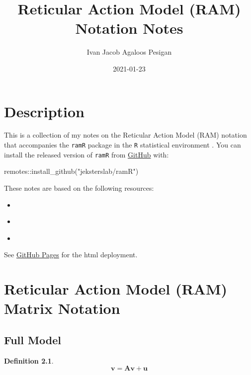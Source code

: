 \documentclass[
]{book}
\title{Reticular Action Model (RAM) Notation Notes}
\author{Ivan Jacob Agaloos Pesigan}
\date{2021-01-23}
\newenvironment{Shaded}{\begin{snugshade}}{\end{snugshade}}
\newcommand{\FunctionTok}[1]{\textcolor[rgb]{0.00,0.00,0.00}{#1}}
\newcommand{\NormalTok}[1]{#1}
\newcommand{\SpecialCharTok}[1]{\textcolor[rgb]{0.00,0.00,0.00}{#1}}
\newcommand{\StringTok}[1]{\textcolor[rgb]{0.31,0.60,0.02}{#1}}
\providecommand{\tightlist}{%
  \setlength{\itemsep}{0pt}\setlength{\parskip}{0pt}}
\theoremstyle{definition}
\newtheorem{definition}{Definition}[chapter]
\theoremstyle{definition}
\theoremstyle{definition}
\theoremstyle{remark}
\begin{document}
\maketitle

{
\setcounter{tocdepth}{1}
\tableofcontents
}
\hypertarget{description}{%
\chapter{Description}\label{description}}

This is a collection of my notes
on the Reticular Action Model (RAM) notation
that accompanies the \texttt{ramR} package \citep{R-ramR}
in the \texttt{R} statistical environment \citep{R-base}.
You can install the released version of \texttt{ramR}
from \href{https://github.com/jeksterslab/ramR}{GitHub} with:

\begin{Shaded}
\begin{Highlighting}[]
\NormalTok{remotes}\SpecialCharTok{::}\FunctionTok{install\_github}\NormalTok{(}\StringTok{"jeksterslab/ramR"}\NormalTok{)}
\end{Highlighting}
\end{Shaded}

These notes are based on the following resources:

\begin{itemize}
\tightlist
\item
  \citet{Boker-2005}
\item
  \citet{McArdle-1984}
\item
  \citet{McArdle-2005}
\end{itemize}

See \href{https://jeksterslab.github.io/ramR_notes/index.html}{GitHub Pages}
for the html deployment.

\hypertarget{ram-matrix-notation}{%
\chapter{Reticular Action Model (RAM) Matrix Notation}\label{ram-matrix-notation}}

\hypertarget{full-model}{%
\section{Full Model}\label{full-model}}

\begin{definition}
\protect\hypertarget{def:unnamed-chunk-2}{}{\label{def:unnamed-chunk-2} }\begin{equation}
  \mathbf{v}
  =
  \mathbf{A} \mathbf{v} + \mathbf{u}
\end{equation}
\end{definition}
\end{document}
